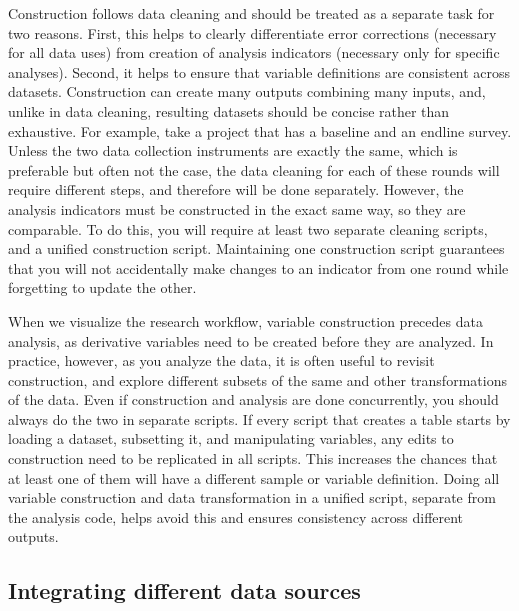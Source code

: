 Construction follows data cleaning and
should be treated as a separate task for two reasons.
First, this helps to clearly differentiate error corrections
(necessary for all data uses)
from creation of analysis indicators
(necessary only for specific analyses).
Second, it helps to ensure that variable definitions are
consistent across datasets.
Construction can create many outputs combining many inputs,
and, unlike in data cleaning,
resulting datasets should be concise rather than exhaustive.
For example, take a project that has a baseline and an endline survey.
Unless the two data collection instruments are exactly the same,
which is preferable but often not the case,
the data cleaning for each of these rounds will require different steps,
and therefore will be done separately.
However, the analysis indicators must be constructed in the exact same way,
so they are comparable.
To do this, you will require at least two separate cleaning scripts,
and a unified construction script.
Maintaining one construction script guarantees that you will not
accidentally make changes to an indicator from one round
while forgetting to update the other.

When we visualize the research workflow,
variable construction precedes data analysis,
as derivative variables need to be created before they are analyzed.
In practice, however, as you analyze the data,
it is often useful to revisit construction,
and explore different subsets of the same and other transformations of the data.
Even if construction and analysis are done concurrently,
you should always do the two in separate scripts.
If every script that creates a table starts by loading a dataset,
subsetting it, and manipulating variables,
any edits to construction need to be replicated in all scripts.
This increases the chances that at least one of them
will have a different sample or variable definition.
Doing all variable construction and data transformation
in a unified script, separate from the analysis code, helps
avoid this and ensures consistency across different outputs.

\subsection{Integrating different data sources}


